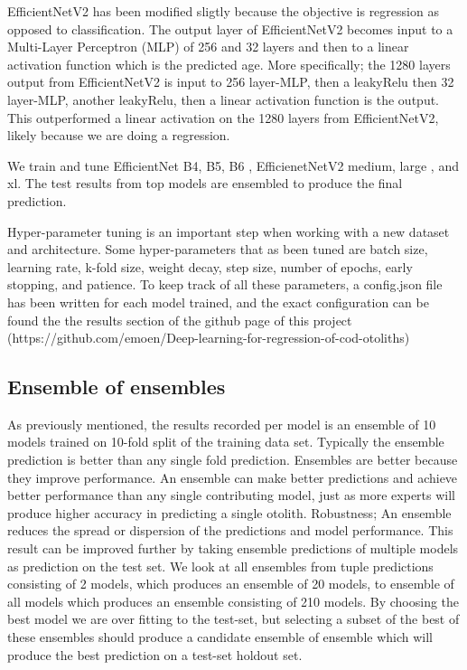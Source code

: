 \documentclass[10pt,letterpaper]{article}
\begin{document}
EfficientNetV2 has been modified sligtly because the objective is regression as opposed to classification. The output layer of EfficientNetV2 becomes input to a Multi-Layer Perceptron (MLP) of 256 and 32 layers and then to a linear activation function which is the predicted age. More specifically; the 1280 layers output from EfficientNetV2 is input to 256 layer-MLP, then a leakyRelu \citep{DBLP:journals/corr/XuWCL15} then 32 layer-MLP, another leakyRelu, then a linear activation function is the output. This outperformed a linear activation on the 1280 layers from EfficientNetV2, likely because we are doing a regression.

We train and tune EfficientNet B4, B5, B6 \citep{DBLP:journals/corr/abs-1905-11946}, EfficienetNetV2 medium, large \citep{DBLP:journals/corr/abs-1905-11946}, and xl. 
The test results from top models are ensembled to produce the final prediction.

Hyper-parameter tuning is an important step when working with a new dataset and architecture. Some hyper-parameters
that as been tuned are batch size, learning rate, k-fold size, weight decay, step size, number of epochs, early stopping, and
patience. To keep track of all these parameters, a config.json file has been written for each model trained, and 
the exact configuration can be found the the results section of the github page of this project
(https://github.com/emoen/Deep-learning-for-regression-of-cod-otoliths)


\subsection*{Ensemble of ensembles}

As previously mentioned, the results recorded per model is an ensemble of 10 models trained on 10-fold split of the
training data set. Typically the ensemble prediction is better than any single fold prediction. Ensembles are better because they improve 
performance. An ensemble can make better predictions and achieve better performance than any single contributing model, just as more
experts will produce higher accuracy in predicting a single otolith.
Robustness; An ensemble reduces the spread or dispersion of the predictions and model performance.
This result can be improved further by taking ensemble predictions of multiple models as prediction on the test set.
We look at all ensembles from tuple predictions consisting of 2 models, which produces an ensemble of 20 models,
to ensemble of all models which produces an ensemble consisting of 210 models. 
By choosing the best model we are over fitting to the test-set, but 
selecting a subset of the best of these ensembles should produce a candidate ensemble
of ensemble which will produce the best prediction on a test-set holdout set.
\end{document}
